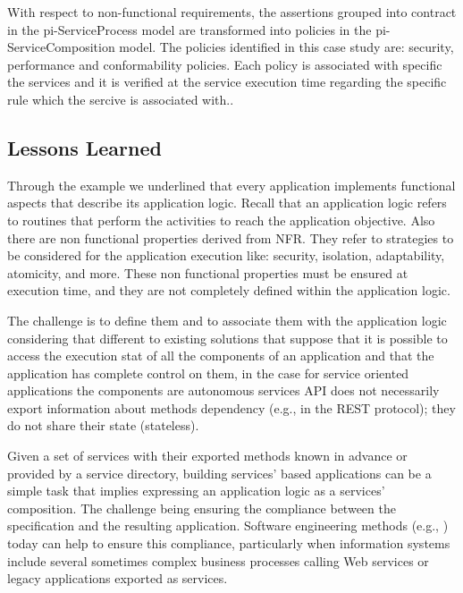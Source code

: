With respect to non-functional requirements, the assertions grouped into contract in the pi-ServiceProcess model are transformed into policies in the pi-ServiceComposition model. The policies identified in this case study are: security, performance and conformability policies. Each policy is associated with specific the services and it is verified at the service execution time regarding the specific rule which the sercive is associated with..





\subsection{Lessons Learned}

Through the example we underlined that every application implements functional aspects that describe its application logic.
Recall that an application logic refers to routines that perform the activities to reach the application objective.
Also there are non functional properties derived from NFR. They refer to strategies to be considered for the application execution like: security, isolation, adaptability, atomicity, and more.
These non functional properties must be ensured at execution time, and they are not completely defined within the application logic.

The challenge is to define them and to associate them with the application logic considering that different to existing solutions that suppose that it is possible to access the execution stat of all the components  of an application and that the application has complete control on them, in the case for service oriented applications  the components are autonomous services
API does not necessarily export information about methods dependency (e.g., in the REST protocol);
they do not share their state (stateless).

Given a set of services with their exported methods known in advance or provided by a  service directory, building services' based applications can be  a simple task that implies expressing an application logic as a services' composition. The challenge being  ensuring the compliance between the specification and the resulting application. Software engineering methods (e.g., \cite{1,2,decastro1,PapazoglouH06}) today can help to ensure this compliance, particularly when information systems include several sometimes complex business processes calling Web services or legacy applications exported as services.
